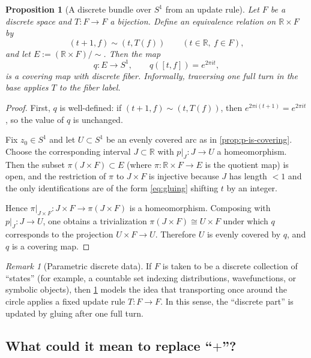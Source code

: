 \documentclass[11pt,a4paper]{article}
\newtheorem{proposition}[theorem]{Proposition}
\theoremstyle{definition}
\theoremstyle{remark}
\newtheorem{remark}[theorem]{Remark}
\begin{document}
\begin{proposition}[A discrete bundle over \(S^{1}\) from an update rule]
\label{prop:mapping-torus-cover}
Let \(F\) be a discrete space and \(T:F\to F\) a bijection. Define an equivalence relation on \(\mathbb{R}\times F\) by
\begin{equation}
\label{eq:gluing}
(t+1,f)\sim (t,T(f)) \qquad (t\in \mathbb{R},\ f\in F),
\end{equation}
and let \(E:=(\mathbb{R}\times F)/\!\sim\). Then the map
\[
q:E\to S^{1},
\qquad
q([t,f])=e^{2\pi i t},
\]
is a covering map with discrete fiber. Informally, traversing one full turn in the base applies \(T\) to the fiber label.
\end{proposition}

\begin{proof}
First, \(q\) is well-defined: if \((t+1,f)\sim (t,T(f))\), then \(e^{2\pi i (t+1)}=e^{2\pi i t}\), so the value of \(q\) is unchanged.

Fix \(z_{0}\in S^{1}\) and let \(U\subset S^{1}\) be an evenly covered arc as in \cref{prop:p-is-covering}. Choose the corresponding interval \(J\subset \mathbb{R}\) with \(p|_{J}:J\to U\) a homeomorphism. Then the subset \(\pi(J\times F)\subset E\) (where \(\pi:\mathbb{R}\times F\to E\) is the quotient map) is open, and the restriction of \(\pi\) to \(J\times F\) is injective because \(J\) has length \(<1\) and the only identifications are of the form \cref{eq:gluing} shifting \(t\) by an integer.

Hence \(\pi|_{J\times F}:J\times F\to \pi(J\times F)\) is a homeomorphism. Composing with \(p|_{J}:J\to U\), one obtains a trivialization \(\pi(J\times F)\cong U\times F\) under which \(q\) corresponds to the projection \(U\times F\to U\). Therefore \(U\) is evenly covered by \(q\), and \(q\) is a covering map.
\end{proof}

\begin{remark}[Parametric discrete data]
\label{rem:parametric-discrete}
If \(F\) is taken to be a discrete collection of ``states'' (for example, a countable set indexing distributions, wavefunctions, or symbolic objects), then \cref{prop:mapping-torus-cover} models the idea that transporting once around the circle applies a fixed update rule \(T:F\to F\). In this sense, the ``discrete part'' is updated by gluing after one full turn.
\end{remark}

\subsection{What could it mean to replace ``\(+\)''?}
\label{sec:change-plus}
\end{document}
